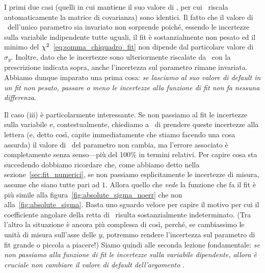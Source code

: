 
I primi due casi (quelli in cui  mantiene il suo valore di
, per cui \scipy\ riscala automaticamente la matrice di
covarianza) sono identici. Il fatto che il valore di \bestfit\ dell'unico
parametro sia invariato non sorprende poiché, essendo le incertezze sulla
variabile indipendente tutte uguali, il fit è sostanzialmente non pesato ed il
minimo del $\chi^2$~\eqref{eq:somma_chiquadro_fit} non dipende dal particolare
valore di $\sigma_y$. Inoltre, dato che le incertezze sono ulteriormente
riscalate da \scipy\ con la prescrizione indicata sopra, anche l'incertezza
sul parametro rimane invariata. Abbiamo dunque imparato una prima cosa:
\emph{se lasciamo  al suo valore di default in un fit non
pesato, passare o meno le incertezze alla funzione di fit non fa nessuna differenza}.

Il caso (iii) è particolarmente interessante. Se non passiamo al fit le incertezze
sulla variabile e, contestualmente, chiediamo a \scipy\ di prendere queste
incertezze alla lettera (e, detto così, capite immediatamente che stiamo
facendo una cosa assurda) il valore di \bestfit\ del parametro non cambia,
ma l'errore associato è completamente senza senso---più del 100\% in termini
relativi. Per capire cosa sta succedendo dobbiamo ricordare che, come abbiamo
detto nella sezione~\ref{sec:fit_numerici}, se non passiamo esplicitamente le
incertezze di misura,  assume che siano tutte pari ad $1$.
Allora quello che \emph{vede} la funzione che fa il fit è più simile alla
figura~\ref{fig:absolute_sigma_noerr} che non alla~\ref{fig:absolute_sigma}.
Basta uno sguardo veloce per capire il motivo per cui il coefficiente angolare
della retta di \bestfit\ risulta sostanzialmente indeterminato.
(Tra l'altro la situazione è ancora più complessa di così, perché, se
cambiassimo le unità di misura sull'asse delle $y$, potremmo rendere
l'incertezza sul parametro di fit grande o piccola a piacere!)
Siamo quindi alle seconda lezione fondamentale: \emph{se non passiamo alla
funzione di fit le incertezze sulla variabile dipendente, allora è cruciale
non cambiare il valore di default dell'argomento }.

